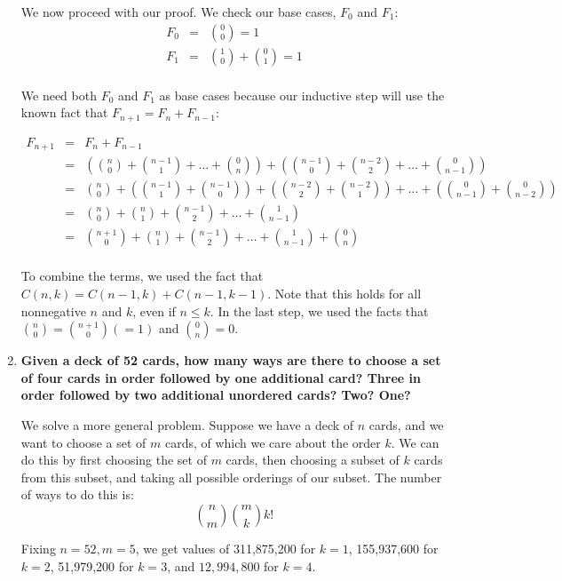 \documentclass[12pt]{amsart}
\begin{document}
\begin{enumerate}
We now proceed with our proof.  We check our base cases, $F_0$ and $F_1$:
\begin{eqnarray*}
F_0 & = & {0 \choose 0} = 1 \\
F_1 & = & {1 \choose 0} + {0 \choose 1} = 1 \\
\end{eqnarray*}

We need both $F_0$ and $F_1$ as base cases because our inductive step
will use the known fact that $F_{n+1} = F_n + F_{n-1}$:

\begin{eqnarray*}
F_{n+1} & = & F_n + F_{n-1} \\
& = & ({n \choose 0} + {n-1 \choose 1} + \ldots + {0 \choose n}) + ({n-1 \choose 0} + {n-2 \choose 2} + \ldots + {0 \choose n-1}) \\
& = & {n \choose 0} + ({n-1 \choose 1} + {n-1 \choose 0}) + ({n-2 \choose 2} + {n-2 \choose 1}) + \ldots + ({0 \choose n-1} + {0 \choose n-2}) \\
& = & {n \choose 0} + {n \choose 1} + {n-1 \choose 2} + \ldots + {1 \choose n-1} \\
& = & {n+1 \choose 0} + {n \choose 1} + {n-1 \choose 2} + \ldots + {1 \choose n-1} + {0 \choose n} \\
\end{eqnarray*}

To combine the terms, we used the fact that $C(n,k) =
C(n-1,k)+C(n-1,k-1)$.  Note that this holds for all nonnegative $n$
and $k$, even if $n \leq k$.  In the last step, we used the facts that
${n \choose 0} = {n+1 \choose 0} (=1)$ and ${0 \choose n} = 0$.

\medskip

\item {\bf Given a deck of 52 cards, how many ways are there to choose a set of four cards in order followed by one additional card?  Three in order followed by two additional unordered cards?  Two?  One?}

We solve a more general problem.  Suppose we have a deck of $n$
cards, and we want to choose a set of $m$ cards, of which we care
about the order $k$.  We can do this by first choosing the set of
$m$ cards, then choosing a subset of $k$ cards from this subset,
and taking all possible orderings of our subset.  The number of
ways to do this is:
$$
{n \choose m}{m \choose k}k!
$$

Fixing $n=52, m=5$, we get values of 311,875,200 for $k=1$,
155,937,600 for $k=2$, 51,979,200 for $k=3$, and $12,994,800$ for $k=4$.





\end{enumerate}
\end{document}
